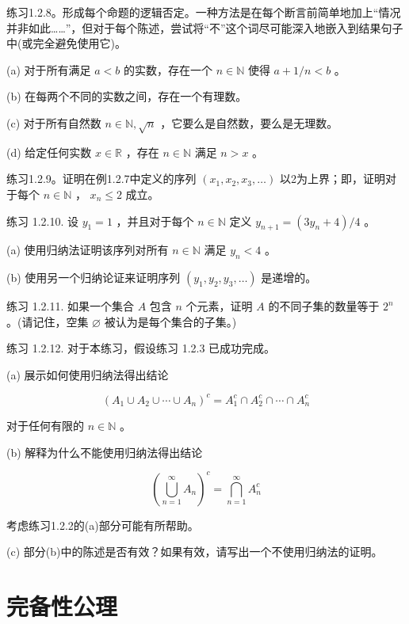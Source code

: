 练习1.2.8。形成每个命题的逻辑否定。一种方法是在每个断言前简单地加上“情况并非如此……”，但对于每个陈述，尝试将“不”这个词尽可能深入地嵌入到结果句子中(或完全避免使用它)。

(a) 对于所有满足 \(a < b\) 的实数，存在一个 \(n \in  \mathbb{N}\) 使得 \(a + 1/n < b\) 。

(b) 在每两个不同的实数之间，存在一个有理数。

(c) 对于所有自然数 \(n \in  \mathbb{N},\sqrt{n}\) ，它要么是自然数，要么是无理数。

(d) 给定任何实数 \(x \in  \mathbb{R}\) ，存在 \(n \in  \mathbb{N}\) 满足 \(n > x\) 。

练习1.2.9。证明在例1.2.7中定义的序列 \(\left( {{x}_{1},{x}_{2},{x}_{3},\ldots }\right)\) 以2为上界；即，证明对于每个 \(n \in  \mathbb{N}\) ， \({x}_{n} \leq  2\) 成立。

练习 1.2.10. 设 \({y}_{1} = 1\) ，并且对于每个 \(n \in  \mathbb{N}\) 定义 \({y}_{n + 1} = \left( {3{y}_{n} + 4}\right) /4\) 。

(a) 使用归纳法证明该序列对所有 \(n \in  \mathbb{N}\) 满足 \({y}_{n} < 4\) 。

(b) 使用另一个归纳论证来证明序列 \(\left( {{y}_{1},{y}_{2},{y}_{3},\ldots }\right)\) 是递增的。

练习 1.2.11. 如果一个集合 \(A\) 包含 \(n\) 个元素，证明 \(A\) 的不同子集的数量等于 \({2}^{n}\) 。(请记住，空集 \(\varnothing\) 被认为是每个集合的子集。)

练习 1.2.12. 对于本练习，假设练习 1.2.3 已成功完成。

(a) 展示如何使用归纳法得出结论

\[
{\left( {A}_{1} \cup  {A}_{2} \cup  \cdots  \cup  {A}_{n}\right) }^{c} = {A}_{1}^{c} \cap  {A}_{2}^{c} \cap  \cdots  \cap  {A}_{n}^{c}
\]

对于任何有限的 \(n \in  \mathbb{N}\) 。

(b) 解释为什么不能使用归纳法得出结论

\[
{\left( \mathop{\bigcup }\limits_{{n = 1}}^{\infty }{A}_{n}\right) }^{c} = \mathop{\bigcap }\limits_{{n = 1}}^{\infty }{A}_{n}^{c}
\]

考虑练习1.2.2的(a)部分可能有所帮助。

(c) 部分(b)中的陈述是否有效？如果有效，请写出一个不使用归纳法的证明。

\section{完备性公理}
\label{sec:1.3}

